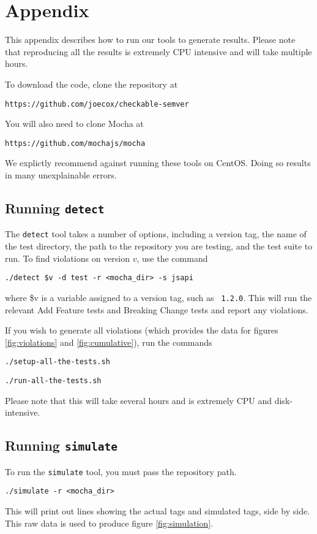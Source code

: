 \section{Appendix}
This appendix describes how to run our tools to generate
results. Please note that reproducing all the results is extremely
CPU intensive and will take multiple hours.

To download the code, clone the repository at
\begin{center}
  {\tt https://github.com/joecox/checkable-semver}
\end{center}

You will also need to clone Mocha at
\begin{center}
  {\tt https://github.com/mochajs/mocha}
\end{center}

We explictly recommend against running these tools on CentOS. Doing
so results in many unexplainable errors.

\subsection{Running {\large {\tt detect}}}

The {\tt detect} tool takes a number of options, including a version
tag, the name of the test directory, the path to the repository you
are testing, and the test suite to run. To find violations on version
$v$, use the command

\begin{center}
  {\tt ./detect \$v -d test -r <mocha\_dir> -s jsapi}
\end{center}
where \$v is a variable assigned to a version tag, such as {\tt
  1.2.0}. This will run the relevant Add Feature tests and Breaking
Change tests and report any violations.

If you wish to generate all violations (which provides the data for
figures \ref{fig:violations} and \ref{fig:cumulative}), run the
commands

\begin{center}
  {\tt ./setup-all-the-tests.sh}
\end{center}
\begin{center}
  {\tt ./run-all-the-tests.sh}
\end{center}
Please note that this will take several hours and is extremely CPU
and disk-intensive.

\subsection{Running {\large {\tt simulate}}}

To run the {\tt simulate} tool, you must pass the repository path.

\begin{center}
  {\tt ./simulate -r <mocha\_dir>}
\end{center}
This will print out lines showing the actual tags and simulated tags,
side by side. This raw data is used to produce figure \ref{fig:simulation}.
